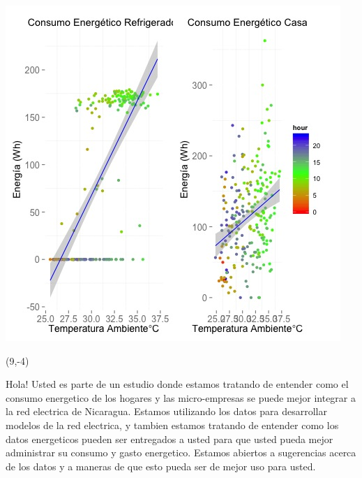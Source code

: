 \documentclass{article}\usepackage[]{graphicx}\usepackage[]{color}
\newenvironment{knitrout}{}{} %
\begin{document}
\begin{knitrout}
\color{fgcolor}
\includegraphics[scale=0.75]{figure/A6_correlaciones} 
\end{knitrout}

 \begin{textblock}{1}(9,-4)
\begin{minipage}{20em}
\begingroup

\endgroup
\end{minipage}
\end{textblock}


\vspace{70px}
\begin{knitrout}
Hola! Usted es parte de un estudio donde estamos tratando de entender como el consumo energetico de los hogares y las micro-empresas se puede mejor integrar a la red electrica de Nicaragua. Estamos utilizando los datos para desarrollar modelos de la red electrica, y tambien estamos tratando de entender como los datos energeticos pueden ser entregados a usted para que usted pueda mejor administrar su consumo y gasto energetico.  Estamos abiertos a sugerencias acerca de los datos y a maneras de que esto pueda ser de mejor uso para usted.
\end{knitrout}
\end{document}
